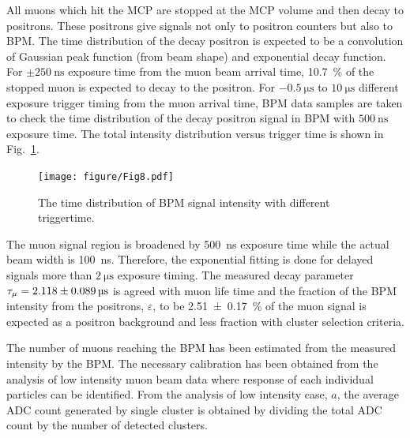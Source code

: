 \documentclass[preprint,3p,twocolumn]{elsarticle}
\begin{document}
All muons which hit the MCP are stopped at the MCP volume and then decay to positrons.
These positrons give signals not only to positron counters but also to BPM.
The time distribution of the decay positron is expected to be a convolution of Gaussian peak function (from beam shape) and exponential decay function.
For $\pm\SI{250}{\nano\s}$ exposure time from the muon beam arrival time, \SI{10.7}{\percent} of the stopped muon is expected to decay to the positron.
For $\SI{-0.5}{\micro\s}$ to $\SI{10}{\micro\s}$ different exposure trigger timing from the muon arrival time, BPM data samples are taken to check the time distribution of the decay positron signal in BPM with $\SI{500}{\nano\s}$ exposure time.
The total intensity distribution versus trigger time is shown in Fig.~\ref{fig:time_distribution}. 

\begin{figure}[htb]
	\vspace{-0.1cm}
	\begin{minipage}[t]{60mm}
		\texttt{[image: figure/Fig8.pdf]}
	\end{minipage}
	\vspace{-0.2cm}
	\caption{The time distribution of BPM signal intensity with different triggertime.}
	\label{fig:time_distribution}
	\vspace{-0.1cm}
\end{figure}
The muon signal region is broadened by \SI{500}{\nano\s} exposure time while the actual beam width is \SI{100}{\nano\s}. Therefore, the exponential fitting is done for delayed signals more than $\SI{2}{\micro\s}$ exposure timing. The measured decay parameter $\tau_{\mu}=\SI{2.118 \pm 0.089}{\micro\s}$ is agreed with muon life time and the fraction of the BPM intensity from the positrons, $\varepsilon$, to be \SI{2.51 \pm 0.17}{\percent} of the muon signal is expected as a positron background and less fraction with cluster selection criteria. 

The number of muons reaching the BPM has been estimated from the measured intensity by the BPM. The necessary calibration has been obtained from the analysis of low intensity muon beam data where response of each individual particles can be identified. From the analysis of low intensity case, $a$, the average ADC count generated by single cluster is obtained by dividing the total ADC count by the number of detected clusters.
\end{document}
